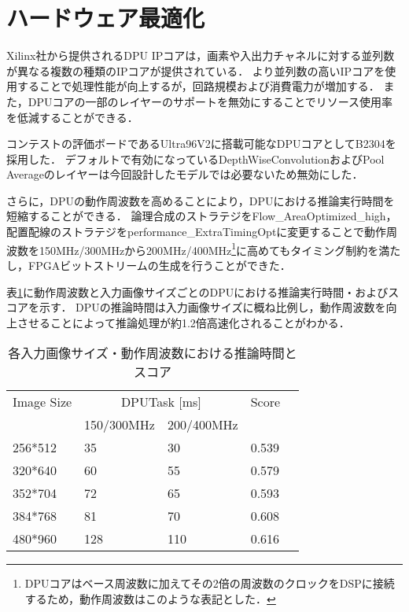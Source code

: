 \section{ハードウェア最適化}
Xilinx社から提供されるDPU IPコアは，画素や入出力チャネルに対する並列数が異なる複数の種類のIPコアが提供されている．
より並列数の高いIPコアを使用することで処理性能が向上するが，回路規模および消費電力が増加する．
また，DPUコアの一部のレイヤーのサポートを無効にすることでリソース使用率を低減することができる．

コンテストの評価ボードであるUltra96V2に搭載可能なDPUコアとしてB2304を採用した．
デフォルトで有効になっているDepthWiseConvolutionおよびPool Averageのレイヤーは今回設計したモデルでは必要ないため無効にした．

さらに，DPUの動作周波数を高めることにより，DPUにおける推論実行時間を短縮することができる．
論理合成のストラテジをFlow\_AreaOptimized\_high，配置配線のストラテジをperformance\_ExtraTimingOptに変更することで動作周波数を150MHz/300MHzから200MHz/400MHz\footnote{DPUコアはベース周波数に加えてその2倍の周波数のクロックをDSPに接続するため，動作周波数はこのような表記とした．}に高めてもタイミング制約を満たし，FPGAビットストリームの生成を行うことができた．

表\ref{runtimetable}に動作周波数と入力画像サイズごとのDPUにおける推論実行時間・およびスコアを示す．
DPUの推論時間は入力画像サイズに概ね比例し，動作周波数を向上させることによって推論処理が約1.2倍高速化されることがわかる．
\begin{table}[b]
    \label{runtimetable}
    \caption{各入力画像サイズ・動作周波数における推論時間とスコア}
    \begin{center}
        \begin{tabular}{lllll}
            Image Size & \multicolumn{2}{c}{DPUTask {[}ms{]}}                            & \multicolumn{1}{c}{Score} &  \\
                & \multicolumn{1}{r}{150/300MHz} & \multicolumn{1}{r}{200/400MHz} &                           &  \\ \hline
        256*512 & 35                             & 30                             & 0.539                     &  \\ \hline
        320*640 & 60                             & 55                             & 0.579                     &  \\ \hline
        352*704 & 72                             & 65                             & 0.593                     &  \\ \hline
        384*768 & 81                             & 70                             & 0.608                     &  \\ \hline
        480*960 & 128                            & 110                            & 0.616                     & 
        \end{tabular}
    \end{center}
\end{table}

